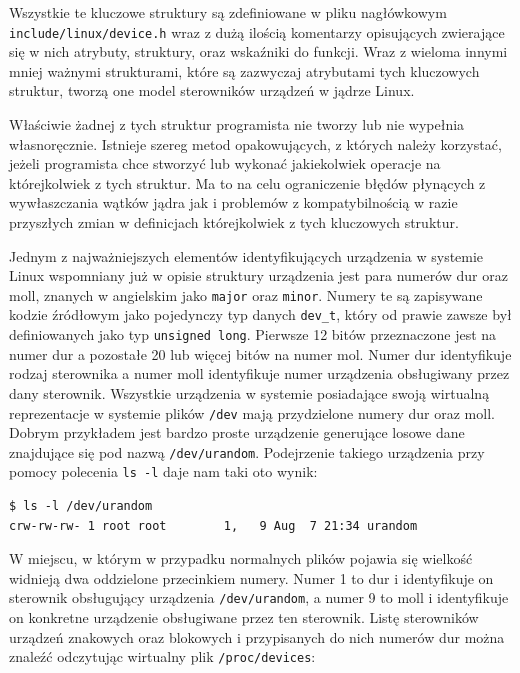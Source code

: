 \documentclass[11pt]{scrartcl}
\begin{document}
Wszystkie te kluczowe struktury są zdefiniowane w pliku nagłówkowym \newline\texttt{include/linux/device.h} wraz z dużą ilością komentarzy opisujących zwierające się w nich atrybuty, struktury, oraz wskaźniki do funkcji. Wraz z wieloma innymi mniej ważnymi strukturami, które są zazwyczaj atrybutami tych kluczowych struktur, tworzą one model sterowników urządzeń w jądrze Linux.

Właściwie żadnej z tych struktur programista nie tworzy lub nie wypełnia własnoręcznie. Istnieje szereg metod opakowujących, z których należy korzystać, jeżeli programista chce stworzyć lub wykonać jakiekolwiek operacje na którejkolwiek z tych struktur. Ma to na celu ograniczenie błędów płynących z wywłaszczania wątków jądra jak i problemów z kompatybilnością w razie przyszłych zmian w definicjach którejkolwiek z tych kluczowych struktur.

Jednym z najważniejszych elementów identyfikujących urządzenia w systemie Linux wspomniany już w opisie struktury urządzenia jest para numerów dur oraz moll, znanych w angielskim jako \texttt{major} oraz \texttt{minor}. Numery te są zapisywane kodzie źródłowym jako pojedynczy typ danych \texttt{dev\_t}, który od prawie zawsze był definiowanych jako typ \texttt{unsigned long}. Pierwsze 12 bitów przeznaczone jest na numer dur a pozostałe 20 lub więcej bitów na numer mol. Numer dur identyfikuje rodzaj sterownika a numer moll identyfikuje numer urządzenia obsługiwany przez dany sterownik. Wszystkie urządzenia w systemie posiadające swoją wirtualną reprezentacje w systemie plików \texttt{/dev} mają przydzielone numery dur oraz moll. Dobrym przykładem jest bardzo proste urządzenie generujące losowe dane znajdujące się pod nazwą \texttt{/dev/urandom}. Podejrzenie takiego urządzenia przy pomocy polecenia \texttt{ls -l} daje nam taki oto wynik:

\begin{verbatim}
$ ls -l /dev/urandom
crw-rw-rw- 1 root root        1,   9 Aug  7 21:34 urandom
\end{verbatim}

W miejscu, w którym w przypadku normalnych plików pojawia się wielkość widnieją dwa oddzielone przecinkiem numery. Numer 1 to dur i identyfikuje on sterownik obsługujący urządzenia \texttt{/dev/urandom}, a numer 9 to moll i identyfikuje on konkretne urządzenie obsługiwane przez ten sterownik. Listę sterowników urządzeń znakowych oraz blokowych i przypisanych do nich numerów dur można znaleźć odczytując wirtualny plik \texttt{/proc/devices}:
\end{document}
